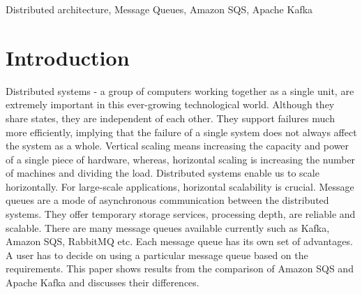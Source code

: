 \documentclass{IEEEtran}
\begin{document}
\begin{IEEEkeywords}
Distributed architecture, Message Queues, Amazon SQS, Apache Kafka
\end{IEEEkeywords}



\IEEEpeerreviewmaketitle



\section{Introduction}\label{sec:introduction}
Distributed systems - a group of computers working together as a single unit, are extremely important in this ever-growing technological world. Although they share states, they are independent of each other. They support failures much more efficiently, implying that the failure of a single system does not always affect the system as a whole. Vertical scaling means increasing the capacity and power of a single piece of hardware, whereas, horizontal scaling is increasing the number of machines and dividing the load. Distributed systems enable us to scale horizontally. For large-scale applications, horizontal scalability is crucial. Message queues are a mode of asynchronous communication between the distributed systems. They offer temporary storage services, processing depth, are reliable and scalable. There are many message queues available currently such as Kafka, Amazon SQS, RabbitMQ etc. Each message queue has its own set of advantages. A user has to decide on using a particular message queue based on the requirements. This paper shows results from the comparison of Amazon SQS and Apache Kafka and discusses their differences.
\end{document}
